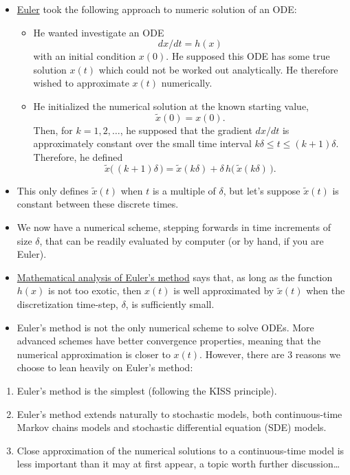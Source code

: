 \documentclass[]{article}
\providecommand{\tightlist}{%
  \setlength{\itemsep}{0pt}\setlength{\parskip}{0pt}}
\begin{document}
\begin{itemize}
\item
  \href{https://en.wikipedia.org/wiki/Leonhard_Euler}{Euler} took the
  following approach to numeric solution of an ODE:

  \begin{itemize}
  \tightlist
  \item
    He wanted investigate an ODE \[dx/dt = h(x)\] with an initial
    condition \(x(0)\). He supposed this ODE has some true solution
    \(x(t)\) which could not be worked out analytically. He therefore
    wished to approximate \(x(t)\) numerically.
  \item
    He initialized the numerical solution at the known starting value,
    \[\tilde x(0)=x(0).\] Then, for \(k=1,2,\dots\), he supposed that
    the gradient \(dx/dt\) is approximately constant over the small time
    interval \(k\delta\le t\le (k+1)\delta\). Therefore, he defined
    \[\tilde x\big( \,(k+1)\delta\,\big) = \tilde x( k\delta) + \delta \, h\big(\, \tilde x(k\delta)\,\big).\]
  \end{itemize}
\item
  This only defines \(\tilde x(t)\) when \(t\) is a multiple of
  \(\delta\), but let's suppose \(\tilde x(t)\) is constant between
  these discrete times.
\item
  We now have a numerical scheme, stepping forwards in time increments
  of size \(\delta\), that can be readily evaluated by computer (or by
  hand, if you are Euler).
\item
  \href{https://en.wikipedia.org/wiki/Euler_method}{Mathematical
  analysis of Euler's method} says that, as long as the function
  \(h(x)\) is not too exotic, then \(x(t)\) is well approximated by
  \(\tilde x(t)\) when the discretization time-step, \(\delta\), is
  sufficiently small.
\item
  Euler's method is not the only numerical scheme to solve ODEs. More
  advanced schemes have better convergence properties, meaning that the
  numerical approximation is closer to \(x(t)\). However, there are 3
  reasons we choose to lean heavily on Euler's method:
\end{itemize}

\begin{enumerate}
\def\labelenumi{\arabic{enumi}.}
\item
  Euler's method is the simplest (following the KISS principle).
\item
  Euler's method extends naturally to stochastic models, both
  continuous-time Markov chains models and stochastic differential
  equation (SDE) models.
\item
  Close approximation of the numerical solutions to a continuous-time
  model is less important than it may at first appear, a topic worth
  further discussion\ldots{}
\end{enumerate}
\end{document}
